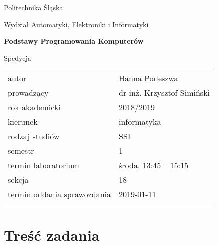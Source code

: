 \documentclass[12pt,a4paper,twoside]{article}
\newcounter{rok}
\begin{document}
\kslistofremarks
\clearpage	
	
\frenchspacing
\thispagestyle{empty}
\begin{center}
{\Large\sf Politechnika Śląska   %

Wydział Automatyki, Elektroniki i Informatyki

}

\vfill

 

\vfill\vfill

{\Huge\sffamily\bfseries Podstawy Programowania Komputerów\par}  

\vfill\vfill

{\LARGE\sf Spedycja}   


\vfill \vfill\vfill\vfill






\begin{tabular}{ll}
	\toprule
	autor                       & Hanna Podeszwa     \\
	prowadzący                  & dr inż. Krzysztof Simiński  \\
	rok akademicki              & 2018/2019         \\
	kierunek                    & informatyka            \\
	rodzaj studiów              & SSI                    \\
	semestr                     & 1                      \\
	termin laboratorium         & środa, 13:45 -- 15:15 \\
	sekcja                      & 18                     \\
	termin oddania sprawozdania & 2019-01-11             \\
	\bottomrule
	                            &
\end{tabular}

\end{center}

\cleardoublepage

\section{Treść zadania}
\end{document}

